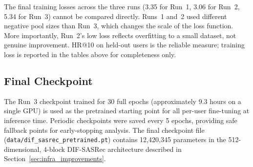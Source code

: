 The final training losses across the three runs (3.35 for Run~1, 3.06 for Run~2, 5.34 for Run~3) cannot be compared directly.
Runs~1 and~2 used different negative pool sizes than Run~3, which changes the scale of the loss function.
More importantly, Run~2's low loss reflects overfitting to a small dataset, not genuine improvement.
HR@10 on held-out users is the reliable measure; training loss is reported in the tables above for completeness only.

\subsection{Final Checkpoint}

The Run~3 checkpoint trained for 30 full epochs (approximately 9.3 hours on a single GPU) is used as the pretrained starting point for all per-user fine-tuning at inference time.
Periodic checkpoints were saved every 5 epochs, providing safe fallback points for early-stopping analysis.
The final checkpoint file (\texttt{data/dif\_sasrec\_pretrained.pt}) contains 12{,}420{,}345 parameters in the 512-dimensional, 4-block DIF-SASRec architecture described in Section~\ref{sec:infra_improvements}.
